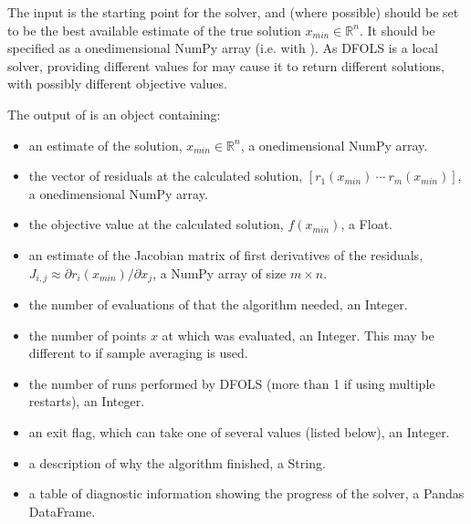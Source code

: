 \documentclass[letterpaper,10pt,english]{sphinxmanual}
\begin{document}
The input  is the starting point for the solver, and (where possible) should be set to be the best available estimate of the true solution \(x_{min}\in\mathbb{R}^n\). It should be specified as a one\sphinxhyphen{}dimensional NumPy array (i.e. with ).
As DFO\sphinxhyphen{}LS is a local solver, providing different values for  may cause it to return different solutions, with possibly different objective values.

The output of  is an object containing:
\begin{itemize}
\item {} 
 \sphinxhyphen{} an estimate of the solution, \(x_{min}\in\mathbb{R}^n\), a one\sphinxhyphen{}dimensional NumPy array.

\item {} 
 \sphinxhyphen{} the vector of residuals at the calculated solution, \([r_1(x_{min})\:\cdots\: r_m(x_{min})]\), a one\sphinxhyphen{}dimensional NumPy array.

\item {} 
 \sphinxhyphen{} the objective value at the calculated solution, \(f(x_{min})\), a Float.

\item {} 
 \sphinxhyphen{} an estimate of the Jacobian matrix of first derivatives of the residuals, \(J_{i,j} \approx \partial r_i(x_{min})/\partial x_j\), a NumPy array of size \(m\times n\).

\item {} 
 \sphinxhyphen{} the number of evaluations of  that the algorithm needed, an Integer.

\item {} 
 \sphinxhyphen{} the number of points \(x\) at which  was evaluated, an Integer. This may be different to  if sample averaging is used.

\item {} 
 \sphinxhyphen{} the number of runs performed by DFO\sphinxhyphen{}LS (more than 1 if using multiple restarts), an Integer.

\item {} 
 \sphinxhyphen{} an exit flag, which can take one of several values (listed below), an Integer.

\item {} 
 \sphinxhyphen{} a description of why the algorithm finished, a String.

\item {} 
 \sphinxhyphen{} a table of diagnostic information showing the progress of the solver, a Pandas DataFrame.

\end{itemize}
\end{document}

